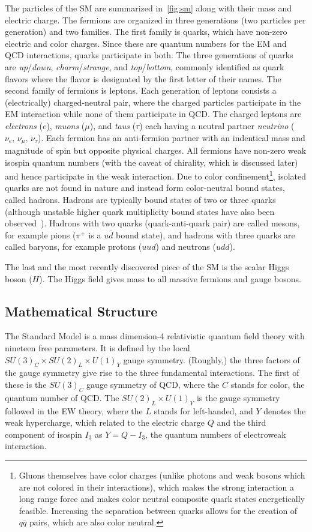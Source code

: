 The particles of the SM are summarized in~\cref{fig:sm} along with their mass and electric charge. The fermions are organized in three generations (two particles per generation) and two families. The first family is quarks, which have non-zero electric and color charges. Since these are quantum numbers for the EM and QCD interactions, quarks participate in both. The three generations of quarks are \textit{up}/\textit{down}, \textit{charm}/\textit{strange}, and \textit{top}/\textit{bottom}, commonly identified as quark flavors where the flavor is designated by the first letter of their names. The second family of fermions is leptons. Each generation of leptons consists a (electrically) charged-neutral pair, where the charged particles participate in the EM interaction while none of them participate in QCD. The charged leptons are \textit{electrons} ($e$), \textit{muons} ($\mu$), and \textit{taus} ($\tau$) each having a neutral partner \textit{neutrino} ($\nu_e,\,\nu_\mu,\,\nu_\tau$). Each fermion has an anti-fermion partner with an indentical mass and magnitude of spin but opposite physical charges. All fermions have non-zero weak isospin quantum numbers (with the caveat of chirality, which is discussed later) and hence participate in the weak interaction. Due to color confinement\footnote{Gluons themselves have color charges (unlike photons and weak bosons which are not colored in their interactions), which makes the strong interaction a long range force and makes color neutral composite quark states energetically feasible. Increasing the separation between quarks allows for the creation of $q\bar{q}$ pairs, which are also color neutral.}, isolated quarks are not found in nature and instead form color-neutral bound states, called hadrons. Hadrons are typically bound states of two or three quarks (although unstable higher quark multiplicity bound states have also been observed~\cite{PhysRevLett.112.222002, PhysRevLett.131.031901}). Hadrons with two quarks (quark-anti-quark pair) are called mesons, for example pions ($\pi^+$ is a $u\bar{d}$ bound state), and hadrons with three quarks are called baryons, for example protons ($uud$) and neutrons ($udd$). 

The last and the most recently discovered piece of the SM is the scalar Higgs boson ($H$). The Higgs field gives mass to all massive fermions and gauge bosons.


\subsection{Mathematical Structure}
The Standard Model is a mass dimension-4 relativistic quantum field theory with nineteen free parameters. It is defined by the local $SU(3)_C \times SU(2)_L \times U(1)_Y$ gauge symmetry. (Roughly,) the three factors of the gauge symmetry give rise to the three fundamental interactions. The first of these is the $SU(3)_C$ gauge symmetry of QCD, where the $C$ stands for color, the quantum number of QCD. The $SU(2)_L \times U(1)_Y$ is the gauge symmetry followed in the EW theory, where the $L$ stands for left-handed, and $Y$ denotes the weak hypercharge, which related to the electric charge $Q$ and the third component of isospin $I_3$ as $Y=Q-I_3$, the quantum numbers of electroweak interaction. 

